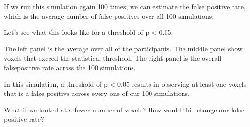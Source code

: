 \documentclass[letterpaper,10pt,english]{sphinxmanual}
\begin{document}
If we run this simulation again 100 times, we can estimate the false positive rate, which is the average number of false positives over all 100 simulations.

Let’s see what this looks like for a threshold of p \textless{} 0.05.

\begin{sphinxVerbatim}[commandchars=\\\{\}]
  
   
  
\end{sphinxVerbatim}

\noindent{}

The left panel is the average over all of the participants. The middle panel show voxels that exceed the statistical threshold. The right panel is the overall false\sphinxhyphen{}positive rate across the 100 simulations.

In this simulation, a threshold of p \textless{} 0.05 results in observing at least one voxels that is a false positive across every one of our 100 simulations.

What if we looked at a fewer number of voxels? How would this change our false positive rate?

\begin{sphinxVerbatim}[commandchars=\\\{\}]
  
   
  
\end{sphinxVerbatim}
\end{document}
